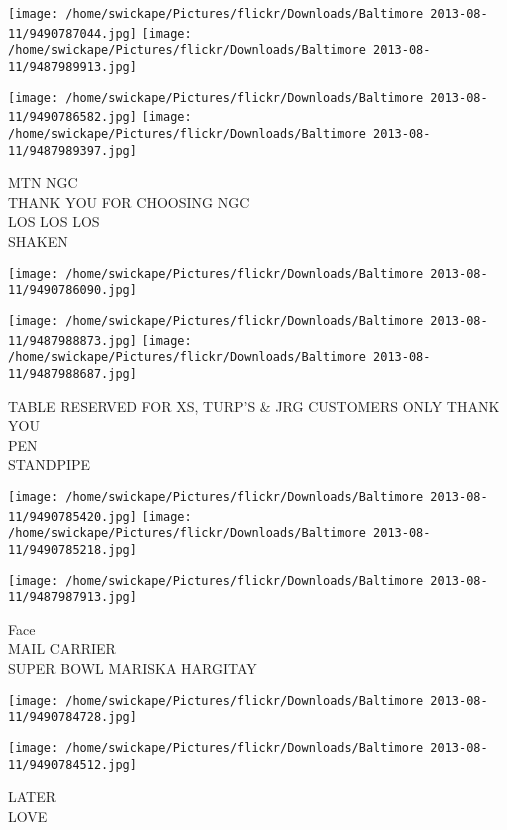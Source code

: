 \documentclass[10pt,letterpaper]{article}
\begin{document}
\texttt{[image: /home/swickape/Pictures/flickr/Downloads/Baltimore 2013-08-11/9490787044.jpg]}
\texttt{[image: /home/swickape/Pictures/flickr/Downloads/Baltimore 2013-08-11/9487989913.jpg]}

\texttt{[image: /home/swickape/Pictures/flickr/Downloads/Baltimore 2013-08-11/9490786582.jpg]}
\texttt{[image: /home/swickape/Pictures/flickr/Downloads/Baltimore 2013-08-11/9487989397.jpg]}

MTN NGC\\
THANK YOU FOR CHOOSING NGC\\
LOS LOS LOS\\
SHAKEN\\
\pagebreak

\texttt{[image: /home/swickape/Pictures/flickr/Downloads/Baltimore 2013-08-11/9490786090.jpg]}

\vspace{0.25in}
\texttt{[image: /home/swickape/Pictures/flickr/Downloads/Baltimore 2013-08-11/9487988873.jpg]}
\texttt{[image: /home/swickape/Pictures/flickr/Downloads/Baltimore 2013-08-11/9487988687.jpg]}

TABLE RESERVED FOR XS, TURP'S \& JRG CUSTOMERS ONLY THANK YOU\\
PEN\\
STANDPIPE\\
\pagebreak

\texttt{[image: /home/swickape/Pictures/flickr/Downloads/Baltimore 2013-08-11/9490785420.jpg]}
\texttt{[image: /home/swickape/Pictures/flickr/Downloads/Baltimore 2013-08-11/9490785218.jpg]}

\texttt{[image: /home/swickape/Pictures/flickr/Downloads/Baltimore 2013-08-11/9487987913.jpg]}

Face\\
MAIL CARRIER\\
SUPER BOWL MARISKA HARGITAY\\
\pagebreak

\texttt{[image: /home/swickape/Pictures/flickr/Downloads/Baltimore 2013-08-11/9490784728.jpg]}

\vspace{0.25in}
\texttt{[image: /home/swickape/Pictures/flickr/Downloads/Baltimore 2013-08-11/9490784512.jpg]}

LATER\\
LOVE\\
\pagebreak
\end{document}

